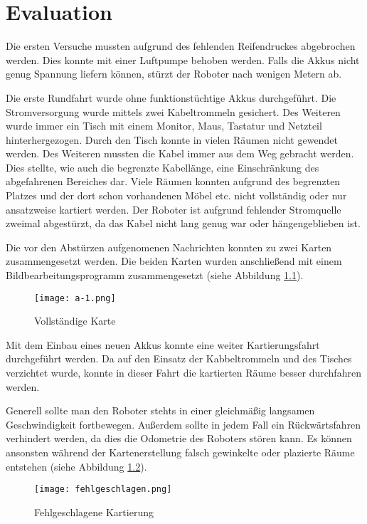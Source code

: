 \chapter{Evaluation} %
\label{cha:evaluation}

Die ersten Versuche mussten aufgrund des fehlenden Reifendruckes abgebrochen werden. Dies konnte mit einer Luftpumpe behoben werden. Falls die Akkus nicht genug Spannung liefern können, stürzt der Roboter nach wenigen Metern ab.\par
Die erste Rundfahrt wurde ohne funktionstüchtige Akkus durchgeführt. Die Strom\-ver\-sor\-gung wurde mittels zwei Kabeltrommeln gesichert. Des Weiteren wurde immer ein Tisch mit einem Monitor, Maus, Tastatur und Netzteil hinterhergezogen. Durch den Tisch konnte in vielen Räumen nicht gewendet werden. Des Weiteren mussten die Kabel immer aus dem Weg gebracht werden. Dies stellte, wie auch die begrenzte Kabellänge, eine Einschränkung des abgefahrenen Bereiches dar. Viele Räumen konnten aufgrund des begrenzten Platzes und der dort schon vorhandenen Möbel etc. nicht vollständig oder nur ansatzweise kartiert werden. Der Roboter ist aufgrund fehlender Stromquelle zweimal abgestürzt, da das Kabel nicht lang genug war oder hängengeblieben ist.\par
Die vor den Abstürzen aufgenomenen Nachrichten konnten zu zwei Karten zusammengesetzt werden. Die beiden Karten wurden anschließend mit einem Bildbearbeitungsprogramm zusammengesetzt (siehe Abbildung \ref{fig:vollstaendige-karte}).\par

\begin{figure}[H]
	\centering
	\texttt{[image: a-1.png]}
	\caption{Vollständige Karte}
	\label{fig:vollstaendige-karte}
\end{figure}

Mit dem Einbau eines neuen Akkus konnte eine weiter Kartierungsfahrt durchgeführt werden. Da auf den Einsatz der Kabbeltrommeln und des Tisches verzichtet wurde, konnte in dieser Fahrt die kartierten Räume besser durchfahren werden.\par
Generell sollte man den Roboter stehts in einer gleichmäßig langsamen Ge\-schwin\-dig\-keit fortbewegen. Außerdem sollte in jedem Fall ein Rückwärtsfahren verhindert werden, da dies die Odometrie des Roboters stören kann. Es können ansonsten während der Kartenerstellung falsch gewinkelte oder plazierte Räume entstehen (siehe Abbildung \ref{fig:fehlgeschlagen}).

\begin{figure}[!htb]
	\centering
	\texttt{[image: fehlgeschlagen.png]}
	\caption{Fehlgeschlagene Kartierung}
	\label{fig:fehlgeschlagen}
\end{figure}

